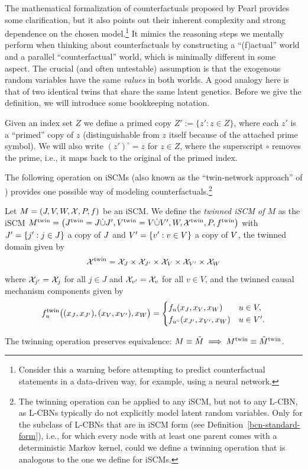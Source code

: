 The mathematical formalization of counterfactuals proposed by Pearl provides some clarification, but it also points out their 
inherent complexity and strong dependence on the chosen model.\footnote{Consider this a warning before attempting to 
predict counterfactual statements in a data-driven way, for example, using a neural network.}
It mimics the reasoning steps we mentally perform when thinking about counterfactuals by constructing a ``(f)actual''
world and a parallel ``counterfactual'' world, which is minimally different in some aspect.
The crucial (and often untestable) assumption is that the exogenous random variables have the same \emph{values} in both worlds.
A good analogy here is that of two identical twins that share the same latent genetics. 
Before we give the definition, we will introduce some bookkeeping notation.
\begin{Not}
  Given an index set $Z$ we define a primed copy $Z' := \{z' : z \in Z\}$, where each $z'$ is a ``primed'' copy of $z$ 
  (distinguishable from $z$ itself because of the attached prime symbol). 
  We will also write $(z')^\circ = z$ for $z \in Z$, where the superscript $\circ$ removes the prime, i.e., it
  maps back to the original of the primed index.
\end{Not}
The following operation on iSCMs (also known as the ``twin-network approach'' of \cite{BalkePearl1994a}) provides one possible way of modeling counterfactuals.\footnote{The twinning operation can be applied to any iSCM, but not to any L-CBN, as L-CBNs typically do not explicitly model latent random variables. Only for the subclass of L-CBNs that are in iSCM form (see Definition~\ref{bcn-standard-form}), i.e., for which every node with at least one parent comes with a deterministic Markov kernel, could we define a twinning operation that is analogous to the one we define for iSCMs.}
\begin{Def}\label{def:twin_scm}
  Let $M = \left ( J, V, W, \mathcal{X}, P, f \right )$ be an iSCM. We define the \emph{twinned iSCM of $M$} as
  the iSCM $M^{\mathrm{twin}} = \left ( J^{\mathrm{twin}} = J \dot\cup J', V^{\mathrm{twin}} = V \dot\cup V', W, \mathcal{X}^{\mathrm{twin}}, P, f^{\mathrm{twin}} \right )$
  with $J' = \{j' : j \in J\}$ a copy of $J$ and
  $V' = \{v' : v \in V\}$ a copy of $V$, the twinned domain given by
  $$\mathcal{X}^{\mathrm{twin}} = \mathcal{X}_{J} \times \mathcal{X}_{J'} \times \mathcal{X}_{V} \times \mathcal{X}_{V'} \times \mathcal{X}_{W}$$
  where $\mathcal{X}_{j'} = \mathcal{X}_j$ for all $j \in J$ and $\mathcal{X}_{v'} = \mathcal{X}_v$ for all $v \in V$,
  and the twinned causal mechanism components given by
  $$f^{\mathrm{twin}}_u\big((x_J,x_{J'}),(x_V,x_{V'}),x_{W}\big) = 
  \begin{cases}
    f_u(x_{J},x_{V},x_{W}) & u \in V,  \\
    f_{u^\circ}(x_{J'},x_{V'},x_{W}) & u \in V'.
  \end{cases}$$
\end{Def}
The twinning operation preserves equivalence: $M \equiv \tilde{M} \implies M^{\mathrm{twin}} \equiv \tilde{M}^{\mathrm{twin}}$.

